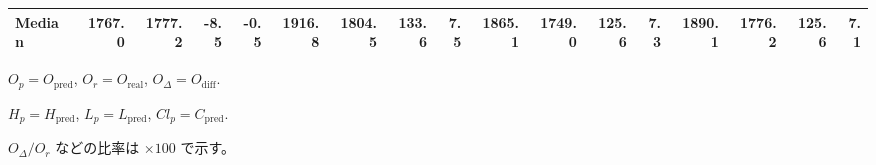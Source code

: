 \begin{threeparttable}
{\begin{tabular}{lrrrrrrrrrrrrrrrr}
 Median & 1767.0 & 1777.2 &       -8.5 &           -0.5 & 1916.8 & 1804.5 &      133.6 &            7.5 & 1865.1 & 1749.0 &      125.6 &            7.3 & 1890.1 & 1776.2 &       125.6 &              7.1 \\
\bottomrule
\end{tabular}
}
\begin{tablenotes}\footnotesize
\item $O_p=O_{\text{pred}}$, $O_r=O_{\text{real}}$, $O_\Delta=O_{\text{diff}}$.
\item $H_p=H_{\text{pred}}$, $L_p=L_{\text{pred}}$, $Cl_p=C_{\text{pred}}$.
\item $O_\Delta/O_r$ などの比率は \(\times100\) で示す。
\end{tablenotes}
\end{threeparttable}
\endgroup
